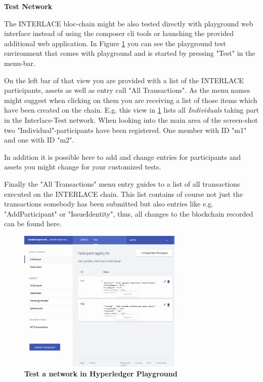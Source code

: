\textbf{Test Network}

The INTERLACE bloc-chain might be also tested directly with playground web interface instead of using the composer cli tools or launching the provided additional web application. In Figure \ref{fig:test-network} you can see the playground test environment that comes with playground and is started by pressing "Test" in the menu-bar.

On the left bar of that view you are provided with a list of the INTERLACE participants, assets as well as entry call "All Transactions". As the menu names might suggest when clicking on them you are receiving a list of those items which have been created on the chain. E.g. this view in \ref{fig:test-network} lists all \textit{Individuals} taking part in the Interlace-Test network. When looking into the main area of the screen-shot two "Individual"-participants have been registered. One member with ID "m1" and one with ID "m2".

In addition it is possible here to add and change entries for participants and assets you might change for your customized tests.

Finally the "All Transactions" menu entry guides to a list of all transactions executed on the INTERLACE chain. This list contains of course not just the transactions somebody has been submitted but also entries like e.g. "AddParticipant" or "IssueIdentity", thus, all changes to the blockchain recorded can be found here.

\begin{figure}[htbp]
  \centering
  \includegraphics[width=0.7\textwidth]{Figures/test-network}
  \caption{\bf\small Test a network in Hyperledger Playground}
  \label{fig:test-network}
\end{figure}

